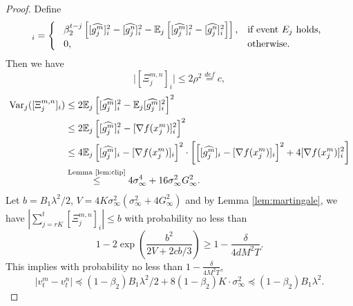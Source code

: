 \documentclass{article} %
\numberwithin{equation}{section}
\begin{document}
\begin{proof}
    Define
    \begin{equation}
        [\Xi_j^{m,n}]_i = \left\{\
        \begin{array}{ll}
            \beta_2^{t-j}\left[[\widehat{g_j^m}]_i^2-[\widehat{g_j^n}]_i^2-\expect_j\left[[\widehat{g_j^m}]_i^2-[\widehat{g_j^n}]_i^2\right]\right], & \text{if event $E_j$ holds,} \\
            0, & \text{otherwise.} 
        \end{array}
        \right.
    \end{equation}
    Then we have
    \begin{equation}
        \bigg|[\Xi_j^{m,n}]_i\bigg|\leq 2\rho^2\overset{def}{=}c,
    \end{equation}
    \begin{equation}
        \begin{aligned}
            \mathrm{Var}_j([\Xi_j^{m,n}]_i)
            &\leq 2\mathbb{E}_j \left[[\widehat{g_j^m}]_i^2-\mathbb{E}_j[\widehat{g_j^m}]_i^2\right]^2 \\
            &\leq 2\mathbb{E}_j \left[[\widehat{g_j^m}]_i^2-[\nabla f(x_j^m)]_i^2\right]^2 \\
            &\leq 4\mathbb{E}_j \left[[\widehat{g_j^m}]_i-[\nabla f(x_j^m)]_i\right]^2\cdot\left[\left[[\widehat{g_j^m}]_i-[\nabla f(x_j^m)]_i\right]^2 + 4[\nabla f(x_j^m)]_i^2\right]  \\
            &\overset{\text{Lemma \ref{lem:clip}}}{\leq} 4\sigma_\infty^4+16\sigma_\infty^2G_{\infty}^2.
        \end{aligned}
    \end{equation}
    Let $b=B_1\lambda^2/2$, $V=4K\sigma_{\infty}^2(\sigma_\infty^2+4G_\infty^2)$ and by Lemma \ref{lem:martingale}, we have $|\sum_{j=rK}^t [\Xi_j^{m,n}]_i|\leq b$ with probability no less than
    \begin{equation}
        1 - 2\exp{\left(\frac{b^2}{2V+2cb/3}\right)} \geq 1-\frac{\delta}{4dM^2T}.
    \end{equation}
    This implies with probability no less than $1-\frac{\delta}{4M^2T}$,
    \begin{equation}
        \bigg|v_t^m-v_t^n\bigg| \preceq (1-\beta_2)B_1\lambda^2/2+8(1-\beta_2)K\cdot \sigma_\infty^2 \preceq (1-\beta_2)B_1\lambda^2.
    \end{equation}


\end{proof}
\end{document}

